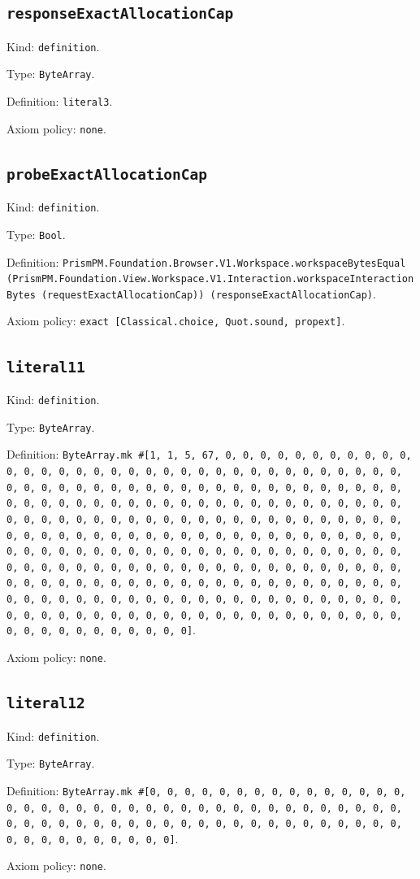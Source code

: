 \documentclass[11pt]{article}
\begin{document}
\subsection*{\texttt{responseExactAllocationCap}}
\noindent Kind: \texttt{definition}.\par
\noindent Type: \texttt{ByteArray}.\par
\noindent Definition: \texttt{literal3}.\par
\noindent Axiom policy: \texttt{none}.\par
\subsection*{\texttt{probeExactAllocationCap}}
\noindent Kind: \texttt{definition}.\par
\noindent Type: \texttt{Bool}.\par
\noindent Definition: \texttt{PrismPM.Foundation.Browser.V1.Workspace.workspaceBytesEqual (PrismPM.Foundation.View.Workspace.V1.Interaction.workspaceInteractionBytes (requestExactAllocationCap)) (responseExactAllocationCap)}.\par
\noindent Axiom policy: \texttt{exact [Classical.choice, Quot.sound, propext]}.\par
\subsection*{\texttt{literal11}}
\noindent Kind: \texttt{definition}.\par
\noindent Type: \texttt{ByteArray}.\par
\noindent Definition: \texttt{ByteArray.mk \#[1, 1, 5, 67, 0, 0, 0, 0, 0, 0, 0, 0, 0, 0, 0, 0, 0, 0, 0, 0, 0, 0, 0, 0, 0, 0, 0, 0, 0, 0, 0, 0, 0, 0, 0, 0, 0, 0, 0, 0, 0, 0, 0, 0, 0, 0, 0, 0, 0, 0, 0, 0, 0, 0, 0, 0, 0, 0, 0, 0, 0, 0, 0, 0, 0, 0, 0, 0, 0, 0, 0, 0, 0, 0, 0, 0, 0, 0, 0, 0, 0, 0, 0, 0, 0, 0, 0, 0, 0, 0, 0, 0, 0, 0, 0, 0, 0, 0, 0, 0, 0, 0, 0, 0, 0, 0, 0, 0, 0, 0, 0, 0, 0, 0, 0, 0, 0, 0, 0, 0, 0, 0, 0, 0, 0, 0, 0, 0, 0, 0, 0, 0, 0, 0, 0, 0, 0, 0, 0, 0, 0, 0, 0, 0, 0, 0, 0, 0, 0, 0, 0, 0, 0, 0, 0, 0, 0, 0, 0, 0, 0, 0, 0, 0, 0, 0, 0, 0, 0, 0, 0, 0, 0, 0, 0, 0, 0, 0, 0, 0, 0, 0, 0, 0, 0, 0, 0, 0, 0, 0, 0, 0, 0, 0, 0, 0, 0, 0, 0, 0, 0, 0, 0, 0, 0, 0, 0, 0, 0, 0, 0, 0, 0, 0, 0, 0, 0, 0, 0, 0, 0, 0, 0, 0, 0, 0, 0, 0, 0, 0, 0, 0, 0, 0, 0, 0, 0, 0, 0, 0, 0, 0, 0, 0, 0, 0, 0, 0, 0, 0, 0, 0, 0, 0, 0, 0]}.\par
\noindent Axiom policy: \texttt{none}.\par
\subsection*{\texttt{literal12}}
\noindent Kind: \texttt{definition}.\par
\noindent Type: \texttt{ByteArray}.\par
\noindent Definition: \texttt{ByteArray.mk \#[0, 0, 0, 0, 0, 0, 0, 0, 0, 0, 0, 0, 0, 0, 0, 0, 0, 0, 0, 0, 0, 0, 0, 0, 0, 0, 0, 0, 0, 0, 0, 0, 0, 0, 0, 0, 0, 0, 0, 0, 0, 0, 0, 0, 0, 0, 0, 0, 0, 0, 0, 0, 0, 0, 0, 0, 0, 0, 0, 0, 0, 0, 0, 0, 0, 0, 0, 0, 0, 0, 0]}.\par
\noindent Axiom policy: \texttt{none}.\par
\end{document}
